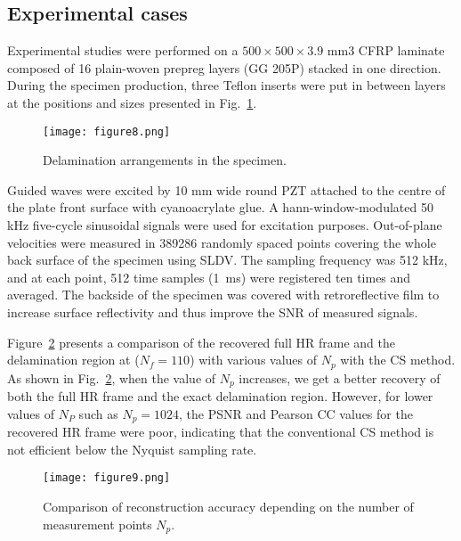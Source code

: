 \subsection{Experimental cases}

Experimental studies were performed on a $500 \times 500\times 3.9$ mm3 CFRP laminate composed of 16 plain-woven prepreg layers (GG 205P) stacked in one direction. 
During the specimen production, three Teflon inserts were put in between layers at the positions and sizes presented in Fig.~\ref{fig:specimen}.

\begin{figure} [!ht]
	\centering
	\texttt{[image: figure8.png]}
	\caption{Delamination arrangements in the specimen.}
	\label{fig:specimen}
\end{figure}

Guided waves were excited by 10 mm wide round PZT attached to the centre of the plate front surface with cyanoacrylate glue. 
A hann-window-modulated 50 kHz five-cycle sinusoidal signals were used for excitation purposes.
Out-of-plane velocities were measured in 389286 randomly spaced points covering the whole back surface of the specimen using SLDV. 
The sampling frequency was 512 kHz, and at each point, 512 time samples (1 ms) were registered ten times and averaged.
The backside of the specimen was covered with retroreflective film to increase surface reflectivity and thus improve the SNR of measured signals.

Figure~\ref{fig:points_metrics} presents a comparison of the recovered full HR frame and the delamination region at ($N_f=110$) with various values of $N_p$ with the CS method.
As shown in Fig.~\ref{fig:points_metrics}, when the value of $N_p$ increases, we get a better recovery of both the full HR frame and the exact delamination region.
However, for lower values of $N_P$ such as $N_p=1024$, the PSNR and Pearson CC values for the recovered HR frame were poor, indicating that the conventional CS method is not efficient below the Nyquist sampling rate.

\begin{figure} [!ht]
	\centering
	\texttt{[image: figure9.png]}
	\caption{Comparison of reconstruction accuracy depending on the number of measurement points $N_p$.}
	\label{fig:points_metrics}
\end{figure}

